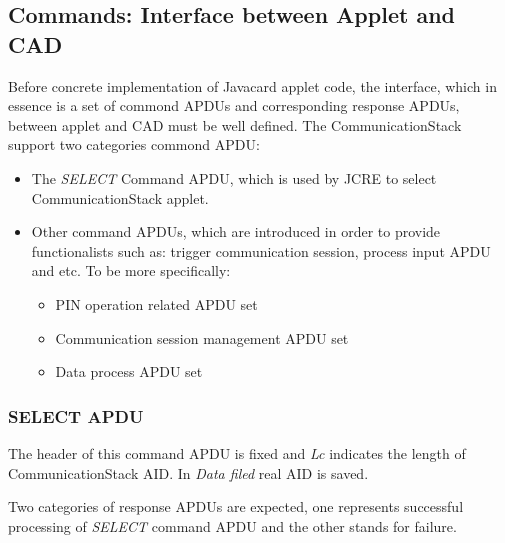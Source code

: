 \subsection {Commands: Interface between Applet and CAD} \label{secAPDU}
Before concrete implementation of Javacard applet code, the interface, which in essence is a set of commond APDUs and corresponding response APDUs, between applet and CAD must be well defined.  The CommunicationStack support two categories commond APDU:
 \begin{itemize}
  \item The \emph{SELECT} Command APDU, which is used by JCRE to select CommunicationStack applet.
  \item Other command APDUs, which are introduced in order to provide functionalists such as: trigger communication session, process input APDU and etc. To be more specifically:
\begin{itemize}
  \item PIN operation related APDU set
  \item Communication session management APDU set
  \item Data process APDU set
\end{itemize}
\end{itemize}

\subsubsection{SELECT APDU}
The header of this command APDU is fixed and \emph{Lc} indicates the length of CommunicationStack AID. In \emph{Data filed} real AID is saved.
\begin{table}[!htbp]
\caption{SELECT command APDU}
\label{select-apdu}
\end{table}
Two categories of response APDUs are expected, one represents successful processing of \emph{SELECT} command APDU and the other stands for failure.
\begin{table}[!htbp]
\caption{SELECT response APDU}
\label{select-response-apdu}
\end{table}

